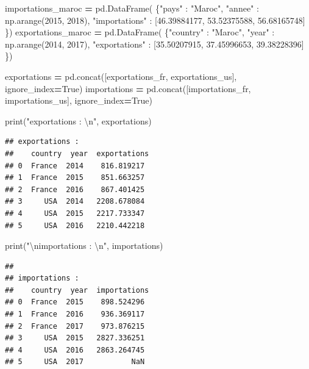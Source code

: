 \documentclass[12pt,]{book}
\newenvironment{Shaded}{\begin{snugshade}}{\end{snugshade}}
\newcommand{\DecValTok}[1]{\textcolor[rgb]{0.00,0.00,0.81}{#1}}
\newcommand{\FloatTok}[1]{\textcolor[rgb]{0.00,0.00,0.81}{#1}}
\newcommand{\CharTok}[1]{\textcolor[rgb]{0.31,0.60,0.02}{#1}}
\newcommand{\StringTok}[1]{\textcolor[rgb]{0.31,0.60,0.02}{#1}}
\newcommand{\VariableTok}[1]{\textcolor[rgb]{0.00,0.00,0.00}{#1}}
\newcommand{\OperatorTok}[1]{\textcolor[rgb]{0.81,0.36,0.00}{\textbf{#1}}}
\newcommand{\BuiltInTok}[1]{#1}
\newcommand{\NormalTok}[1]{#1}
\numberwithin{equation}{section}
\numberwithin{countremarque}{section}
\begin{document}
\begin{Shaded}
\begin{Highlighting}[]
\NormalTok{importations_maroc }\OperatorTok{=}\NormalTok{ pd.DataFrame(}
\NormalTok{    \{}\StringTok{"pays"}\NormalTok{ : }\StringTok{"Maroc"}\NormalTok{,}
     \StringTok{"annee"}\NormalTok{ : np.arange(}\DecValTok{2015}\NormalTok{, }\DecValTok{2018}\NormalTok{),}
     \StringTok{"importations"}\NormalTok{ : [}\FloatTok{46.39884177}\NormalTok{, }\FloatTok{53.52375588}\NormalTok{, }\FloatTok{56.68165748}\NormalTok{]}
\NormalTok{    \})}
\NormalTok{exportations_maroc }\OperatorTok{=}\NormalTok{ pd.DataFrame(}
\NormalTok{    \{}\StringTok{"country"}\NormalTok{ : }\StringTok{"Maroc"}\NormalTok{,}
     \StringTok{"year"}\NormalTok{ : np.arange(}\DecValTok{2014}\NormalTok{, }\DecValTok{2017}\NormalTok{),}
     \StringTok{"exportations"}\NormalTok{ : [}\FloatTok{35.50207915}\NormalTok{, }\FloatTok{37.45996653}\NormalTok{, }\FloatTok{39.38228396}\NormalTok{]}
\NormalTok{    \})}

\NormalTok{exportations }\OperatorTok{=}\NormalTok{ pd.concat([exportations_fr, exportations_us], ignore_index}\OperatorTok{=}\VariableTok{True}\NormalTok{)}
\NormalTok{importations }\OperatorTok{=}\NormalTok{ pd.concat([importations_fr, importations_us], ignore_index}\OperatorTok{=}\VariableTok{True}\NormalTok{)}

\BuiltInTok{print}\NormalTok{(}\StringTok{"exportations : }\CharTok{\textbackslash{}n}\StringTok{"}\NormalTok{, exportations)}
\end{Highlighting}
\end{Shaded}

\begin{lstlisting}
## exportations : 
##    country  year  exportations
## 0  France  2014    816.819217
## 1  France  2015    851.663257
## 2  France  2016    867.401425
## 3     USA  2014   2208.678084
## 4     USA  2015   2217.733347
## 5     USA  2016   2210.442218
\end{lstlisting}

\begin{Shaded}
\begin{Highlighting}[]
\BuiltInTok{print}\NormalTok{(}\StringTok{"}\CharTok{\textbackslash{}n}\StringTok{importations : }\CharTok{\textbackslash{}n}\StringTok{"}\NormalTok{, importations)}
\end{Highlighting}
\end{Shaded}

\begin{lstlisting}
## 
## importations : 
##    country  year  importations
## 0  France  2015    898.524296
## 1  France  2016    936.369117
## 2  France  2017    973.876215
## 3     USA  2015   2827.336251
## 4     USA  2016   2863.264745
## 5     USA  2017           NaN
\end{lstlisting}
\end{document}
